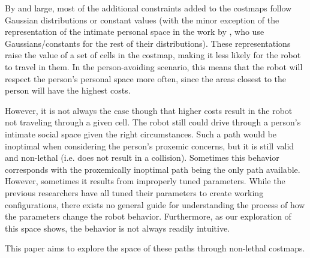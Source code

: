 By and large, most of the additional constraints added to the costmaps follow Gaussian distributions or constant values (with the minor exception of the representation of the intimate personal space in the work by \citet{fraichard:anthronav}, who use Gaussians/constants for the rest of their distributions). These representations raise the value of a set of cells in the costmap, making it less likely for the robot to travel in them. In the person-avoiding scenario, this means that the robot will respect the person's personal space more often, since the areas closest to the person will have the highest costs.

However, it is not always the case though that higher costs result in the robot not traveling through a given cell. The robot still could drive through a person's intimate social space given the right circumstances. Such a path would be inoptimal when considering the person's proxemic concerns, but it is still valid and non-lethal (i.e. does not result in a collision). Sometimes this behavior corresponds with the proxemically inoptimal path being the only path available. However, sometimes it results from improperly tuned parameters. While the previous researchers have all tuned their parameters to create working configurations, there exists no general guide for understanding the process of how the parameters change the robot behavior. Furthermore, as our exploration of this space shows, the behavior is not always readily intuitive. 

This paper aims to explore the space of these paths through non-lethal costmaps. 







